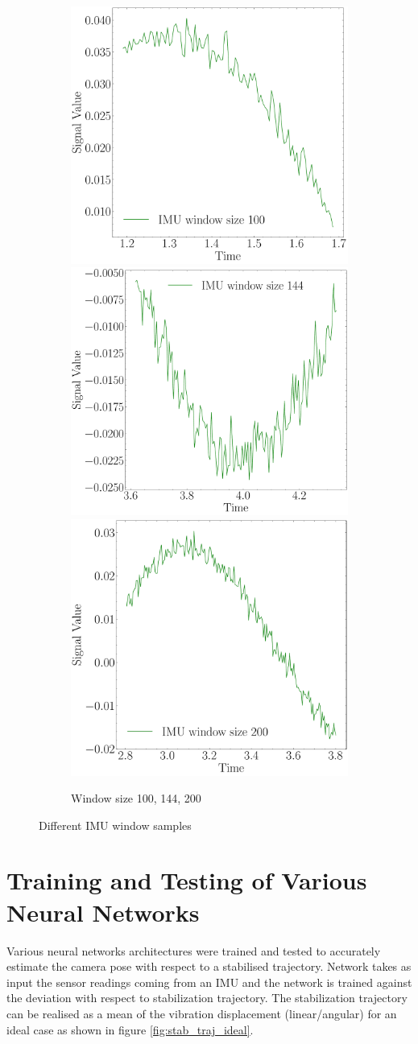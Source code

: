 \begin{figure}[H]
    \begin{subfigure}{\linewidth}
    \includegraphics[width=.3\linewidth]{images/fig_chapter4/imu_windows/imu_window_size_100.pdf}\hfill
    \includegraphics[width=.3\linewidth]{images/fig_chapter4/imu_windows/imu_window_size_144.pdf}\hfill
    \includegraphics[width=.3\linewidth]{images/fig_chapter4/imu_windows/imu_window_size_200.pdf}\hfill
    \caption{Window size 100, 144, 200}
    \end{subfigure}
\caption{Different IMU window samples}
\label{fig:imu_window_samples}
\end{figure}

\section{Training and Testing of Various Neural Networks}
Various neural networks architectures were trained and tested to accurately estimate the camera pose with respect to a stabilised trajectory. Network takes as input the sensor readings coming from an IMU and the network is trained against the deviation with respect to stabilization trajectory. The stabilization trajectory can be realised as a mean of the vibration displacement (linear/angular) for an ideal case as shown in figure \ref{fig:stab_traj_ideal}. 

